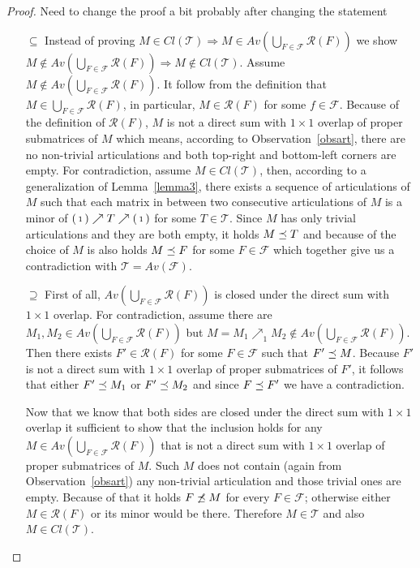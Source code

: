 \begin{proof}Need to change the proof a bit probably after changing the statement
\begin{itemize}
\item[$\subseteq$] Instead of proving $M\in Cl(\mathcal{T})\Rightarrow M\in Av(\bigcup_{F\in\mathcal{F}}\mathcal{R}(F))$ we show $M\not\in Av(\bigcup_{F\in\mathcal{F}}\mathcal{R}(F))\Rightarrow M\not\in Cl(\mathcal{T})$. Assume $M\not\in Av(\bigcup_{F\in\mathcal{F}}\mathcal{R}(F))$. It follow from the definition that $M\in\bigcup_{F\in\mathcal{F}}\mathcal{R}(F)$, in particular, $M\in\mathcal{R}(F)$ for some $f\in\mathcal{F}$. Because of the definition of $\mathcal{R}(F)$, $M$ is not a direct sum with $1\times1$ overlap of proper submatrices of $M$ which means, according to Observation~\ref{obsart}, there are no non-trivial articulations and both top-right and bottom-left corners are empty. For contradiction, assume $M\in Cl(\mathcal{T})$, then, according to a generalization of Lemma~\ref{lemma3}, there exists a sequence of articulations of $M$ such that each matrix in between two consecutive articulations of $M$ is a minor of $\left(\begin{smallmatrix}1\end{smallmatrix}\right)\nearrow T\nearrow\left(\begin{smallmatrix}1\end{smallmatrix}\right)$ for some $T\in\mathcal{T}$. Since $M$ has only trivial articulations and they are both empty, it holds $M\preceq T$ and because of the choice of $M$ is also holds $M\preceq F$ for some $F\in\mathcal{F}$ which together give us a contradiction with $\mathcal{T}=Av(\mathcal{F})$.
\item[$\supseteq$] First of all, $Av(\bigcup_{F\in\mathcal{F}}\mathcal{R}(F))$ is closed under the direct sum with $1\times1$ overlap. For contradiction, assume there are $M_1,M_2\in Av(\bigcup_{F\in\mathcal{F}}\mathcal{R}(F))$ but $M=M_1\nearrow_{1}M_2\not\in Av(\bigcup_{F\in\mathcal{F}}\mathcal{R}(F))$. Then there exists $F'\in\mathcal{R}(F)$ for some $F\in\mathcal{F}$ such that $F'\preceq M$. Because $F'$ is not a direct sum with $1\times1$ overlap of proper submatrices of $F'$, it follows that either $F'\preceq M_1$ or $F'\preceq M_2$ and since $F\preceq F'$ we have a contradiction.

Now that we know that both sides are closed under the direct sum with $1\times1$ overlap it sufficient to show that the inclusion holds for any $M\in Av(\bigcup_{F\in\mathcal{F}}\mathcal{R}(F))$ that is not a direct sum with $1\times1$ overlap of proper submatrices of $M$. Such $M$ does not contain (again from Observation~\ref{obsart}) any non-trivial articulation and those trivial ones are empty. Because of that it holds $F\not\preceq M$ for every $F\in\mathcal{F}$; otherwise either $M\in\mathcal{R}(F)$ or its minor would be there. Therefore $M\in\mathcal{T}$ and also $M\in Cl(\mathcal{T})$.
\end{itemize}
\end{proof}

